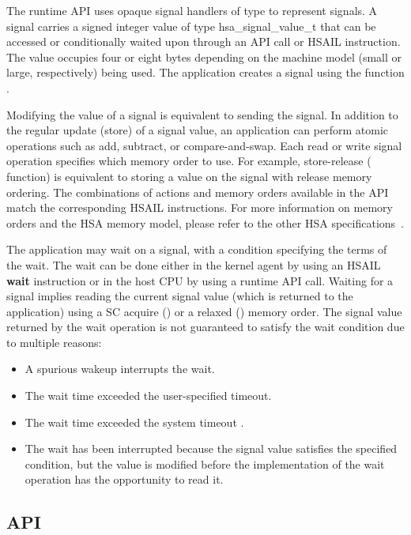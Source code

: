 \documentclass[final,oneside]{book}
\newcommand{\reffun}[1]{\textbf{#1}}
\newcommand{\reftyp}[1]{#1}
\newcommand{\refhsl}[1]{\reffun{#1}}
\begin{document}
The runtime API uses opaque signal handlers of type  to
represent signals. A signal carries a signed integer value of type
\reftyp{hsa_signal_value_t} that can be accessed or conditionally waited upon
through an API call or HSAIL instruction. The value occupies four or eight bytes
depending on the machine model (small or large, respectively) being used. The
application creates a signal using the function .

Modifying the value of a signal is equivalent to sending the signal. In addition
to the regular update (store) of a signal value, an application can perform
atomic operations such as add, subtract, or compare-and-swap. Each read or write
signal operation specifies which memory order to use. For example, store-release
( function) is equivalent to storing a value on
the signal with release memory ordering. The combinations of actions and
memory orders available in the API match the corresponding HSAIL
instructions. For more information on memory orders and the HSA memory model,
please refer to the other HSA specifications~\cite{prm, sar}.

The application may wait on a signal, with a condition specifying the terms of
the wait. The wait can be done either in the kernel agent by using an HSAIL
\refhsl{wait} instruction or in the host CPU by using a runtime API
call. Waiting for a signal implies reading the current signal value (which is
returned to the application) using a SC acquire
() or a relaxed
() memory order. The signal value returned by
the wait operation is not guaranteed to satisfy the wait condition due to
multiple reasons:
\begin{itemize}[itemsep=1pt,topsep=3pt,partopsep=0pt]
\item A spurious wakeup interrupts the wait.
\item The wait time exceeded the user-specified timeout.
\item The wait time exceeded the system timeout
  .
\item The wait has been interrupted because the signal value satisfies the
  specified condition, but the value is modified before the implementation of
  the wait operation has the opportunity to read it.
\end{itemize}


\subsection{API}
\end{document}
